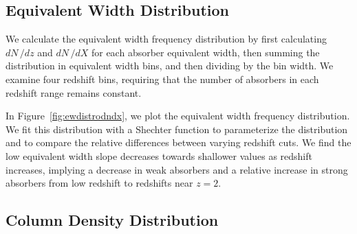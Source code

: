 \subsection{Equivalent Width Distribution}
\label{ch6:ewdistro}


We calculate the equivalent width frequency distribution by first calculating $dN\,/dz$ and $dN\,/dX$ for each absorber equivalent width, then summing the distribution in equivalent width bins, and then dividing by the bin width. We examine four redshift bins, requiring that the number of absorbers in each redshift range remains constant.

In Figure~\ref{fig:ewdistrodndx}, we plot the equivalent width frequency distribution. We fit this distribution with a Shechter function to parameterize the distribution and to compare the relative differences between varying redshift cuts. We find the low equivalent width slope decreases towards shallower values as redshift increases, implying a decrease in weak {\CIV} absorbers and a relative increase in strong {\CIV} absorbers from low redshift to redshifts near $z = 2$.

\begin{figure*}[bth]
\caption{The equivalent width distribution of ${\CIV}$ absorbers, defined as the comoving line density ($\frac{dN}{dX}$) in each equivalent width bin divided by the bin width. We fit this distribution with a Schechter function, capturing the self-similar power law behavior of the distribution before the exponential cutoff limiting the size of ${\CIV}$ absorbers.}
\label{fig:ewdistrodndz}
\end{figure*}

\begin{figure*}[bth]
\caption{The equivalent width distribution of {\CIV} absorbers, defined as the comoving line density ($\frac{dN}{dX}$) in each equivalent width bin divided by the bin width. We fit this distribution with a Schechter function, capturing the self-similar power law behavior of the distribution before the exponential cutoff limiting the size of {\CIV} absorbers.}
\label{fig:ewdistrodndx}
\end{figure*}

\subsection{Column Density Distribution}
\label{ch6:columndistro}

